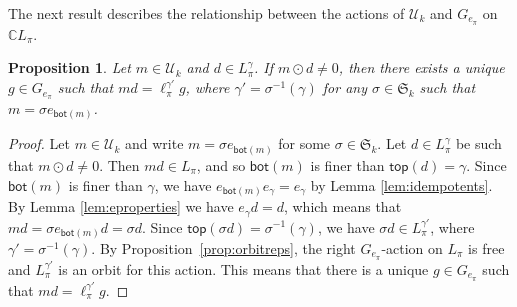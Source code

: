 \documentclass[10pt]{amsart}
\newtheorem{prop}[theorem]{Proposition}
\theoremstyle{definition}
\theoremstyle{remark}
\newcommand{\CC}{\mathbb C}
\begin{document}
The next result describes the relationship between the actions of
$\mathcal{U}_k$ and $G_{e_\pi}$ on $\CC{L_\pi}$.
\begin{prop}\label{prop:GeactiononL}
Let $m\in \mathcal{U}_k$ and $d\in L_\pi^\gamma$. If $m \odot d \neq 0$,
then there exists a unique $g \in G_{e_\pi}$  such that $md = \ell_\pi^{\gamma'} g$,
where $\gamma' = \sigma^{-1}(\gamma)$ for any $\sigma \in \mathfrak{S}_k$ such that $m = \sigma e_{\mathsf{bot}(m)}$.
\end{prop}
\begin{proof}
Let $m\in \mathcal{U}_k$ and write $m = \sigma e_{\mathsf{bot}(m)}$ for some $\sigma \in \mathfrak{S}_k$.
Let $d\in L_\pi^\gamma$ be such that $m \odot d \neq 0$.
Then $md \in L_\pi$, and so $\mathsf{bot}(m)$ is finer than $\mathsf{top}(d) = \gamma$.
Since $\mathsf{bot}(m)$ is finer than $\gamma$, we have $e_{\mathsf{bot}(m)} e_\gamma = e_\gamma$ by Lemma \ref{lem:idempotents}.
By Lemma \ref{lem:eproperties} we have $e_\gamma d = d$, which means that $md = \sigma e_{\mathsf{bot}(m)} d = \sigma d$.
Since $\mathsf{top}(\sigma d) = \sigma^{-1}(\gamma)$, we have $\sigma d \in L_\pi^{\gamma'}$, where $\gamma' = \sigma^{-1}(\gamma)$.
By Proposition~\ref{prop:orbitreps},
the right $G_{e_\pi}$-action on $L_\pi$ is free and $L_\pi^{\gamma'}$ is an orbit for this action.
This means that there is a unique $g\in G_{e_\pi}$ such that $m d = \ell_\pi^{\gamma'} g$.
\end{proof}
\end{document}
